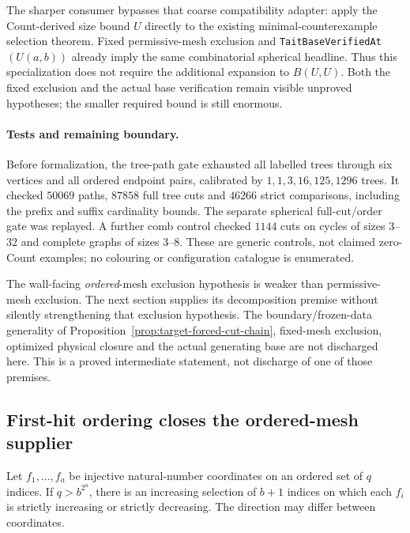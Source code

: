 The sharper consumer bypasses that coarse compatibility adapter: apply
the Count-derived size bound $U$ directly to the existing
minimal-counterexample selection theorem.  Fixed permissive-mesh exclusion
and \texttt{TaitBaseVerifiedAt}$(U(a,b))$ already imply the same
combinatorial spherical headline.
Thus this specialization does not require the additional expansion to
$B(U,U)$.  Both the fixed exclusion and the actual base verification remain
visible unproved hypotheses; the smaller required bound is still enormous.

\paragraph{Tests and remaining boundary.}
Before formalization, the tree-path gate exhausted all labelled trees
through six vertices and all ordered endpoint pairs, calibrated by
$1,1,3,16,125,1296$ trees.  It checked $50069$ paths, $87858$ full tree
cuts and $46266$ strict comparisons, including the prefix and suffix
cardinality bounds.  The separate spherical full-cut/order gate was
replayed.  A further comb control checked $1144$ cuts on cycles of sizes
$3$--$32$ and complete graphs of sizes $3$--$8$.  These are generic
controls, not claimed zero-Count examples; no colouring or configuration
catalogue is enumerated.

The wall-facing \emph{ordered}-mesh exclusion hypothesis is weaker than
permissive-mesh exclusion.  The next section supplies its decomposition
premise without silently strengthening that exclusion hypothesis.
The boundary/frozen-data generality of
Proposition~\ref{prop:target-forced-cut-chain}, fixed-mesh exclusion,
optimized physical closure and the actual generating base are not
discharged here.  This is a proved intermediate statement, not discharge of
one of those premises.

\subsection{First-hit ordering closes the ordered-mesh supplier}
\label{sec:ordered-mesh-supply}

\begin{lemma}
Let $f_1,\ldots,f_a$ be injective natural-number coordinates on an ordered set of $q$
indices.  If $q>b^{2^a}$, there is an increasing selection of $b+1$
indices on which each $f_i$ is strictly increasing or strictly decreasing.
The direction may differ between coordinates.
\end{lemma}

